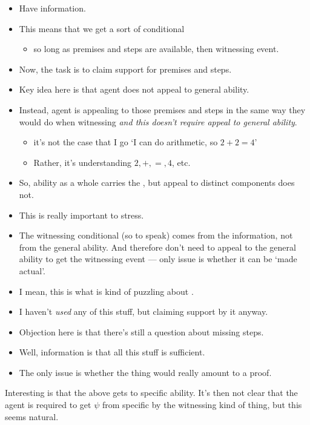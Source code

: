 \begin{note}
  \large
  \begin{itemize}
  \item Have \gsi{} information.
  \item This means that we get a sort of conditional
    \begin{itemize}
    \item so long as premises and steps are available, then witnessing event.
    \end{itemize}
  \item Now, the task is to claim support for premises and steps.
  \item Key idea here is that agent does not appeal to general ability.
  \item Instead, agent is appealing to those premises and steps in the same way they would do when witnessing \emph{and this doesn't require appeal to general ability}.
    \begin{itemize}
    \item it's not the case that I go `I can do arithmetic, so \(2 + 2 = 4\)'
    \item Rather, it's understanding \(2,+,=,4\), etc.
    \end{itemize}
  \item So, ability as a whole carries the \expec{}, but appeal to distinct components does not.
  \item This is really important to stress.
  \item The witnessing conditional (so to speak) comes from the information, not from the general ability.
    And therefore don't need to appeal to the general ability to get the witnessing event --- only issue is whether it can be `made actual'.
  \item I mean, this is what is kind of puzzling about \EAS{}.
  \item I haven't \emph{used} any of this stuff, but claiming support by it anyway.
  \end{itemize}

  \begin{itemize}
  \item Objection here is that there's still a question about missing steps.
  \item Well, information is that all this stuff is sufficient.
  \item The only issue is whether the thing would really amount to a proof.
  \end{itemize}

  \begin{note}
    Interesting is that the above gets to specific ability.
    It's then not clear that the agent is required to get \(\psi\) from specific by the witnessing kind of thing, but this seems natural.
  \end{note}
\end{note}

